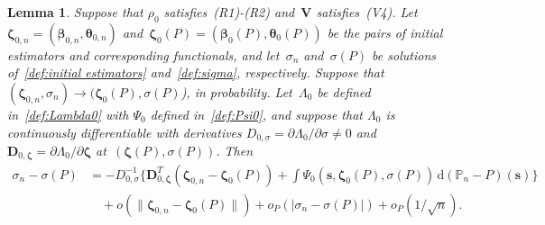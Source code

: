 \documentclass{article}
\numberwithin{equation}{section}
\theoremstyle{plain}
\newtheorem{lemma}{Lemma}
\newcommand{\dd}{\mathrm{d}}
\newcommand{\bbeta}{\bm\beta}
\newcommand{\btheta}{\bm\theta}
\newcommand{\bzeta}{\bm\zeta}
\newcommand{\bV}{\mathbf{V}}
\newcommand{\bD}{\mathbf{D}}
\begin{document}
\begin{lemma}
\label{lem:asymp relation sigma zeta}
Suppose that $\rho_0$ satisfies~(R1)-(R2) and~$\bV$ satisfies~(V4).
Let $\bzeta_{0,n}=(\bbeta_{0,n},\btheta_{0,n})$ 
and~$\bzeta_0(P)=(\bbeta_0(P),\btheta_0(P))$ be the pairs of initial estimators and 
corresponding functionals, and let~$\sigma_n$ and~$\sigma(P)$ be solutions of~\eqref{def:initial estimators} and~\eqref{def:sigma}, respectively.
Suppose that $(\bzeta_{0,n},\sigma_n)\to(\bzeta_0(P),\sigma(P)$), in probability.
Let~$\Lambda_0$ be defined in~\eqref{def:Lambda0} with $\Psi_0$ defined in~\eqref{def:Psi0},
and suppose that $\Lambda_0$
is continuously differentiable with derivatives
$D_{0,\sigma}=\partial\Lambda_0/\partial\sigma\ne0$ 
and
$\bD_{0,\bzeta}=\partial\Lambda_0/\partial\bzeta$
at~$(\bzeta(P),\sigma(P))$.
Then 
\[
\begin{split}
\sigma_n-\sigma(P)
&=
-D_{0,\sigma}^{-1}
\bigg\{
\bD_{0,\bzeta}^T(\bzeta_{0,n}-\bzeta_0(P))
+
\int \Psi_0(\mathbf{s},\bzeta_0(P),\sigma(P))\,\dd (\mathbb{P}_n-P)(\mathbf{s})
\bigg\}\\
&\quad+
o(\|\bzeta_{0,n}-\bzeta_0(P)\|)
+
o_P(|\sigma_n-\sigma(P)|)
+
o_P(1/\sqrt{n}).
\end{split}
\]
\end{lemma}
\end{document}

